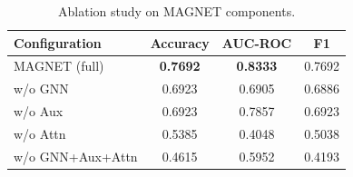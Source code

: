 \begin{table}[h]\centering
\caption{Ablation study on MAGNET components.}
\begin{tabular}{lccc}\hline
Configuration & Accuracy & AUC-ROC & F1 \\\hline
MAGNET (full) & \textbf{0.7692} & \textbf{0.8333} & 0.7692 \\
w/o GNN & 0.6923 & 0.6905 & 0.6886 \\
w/o Aux & 0.6923 & 0.7857 & 0.6923 \\
w/o Attn & 0.5385 & 0.4048 & 0.5038 \\
w/o GNN+Aux+Attn & 0.4615 & 0.5952 & 0.4193 \\
\hline\end{tabular}\label{tab:ablation}\end{table}